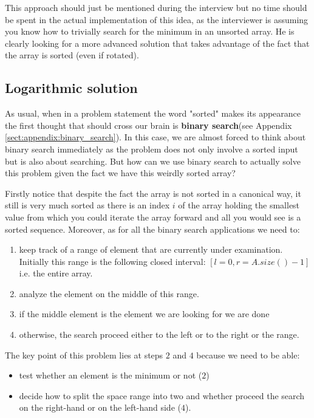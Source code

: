 


This approach should just be mentioned during the interview but no time should be spent in the actual implementation of this idea, as the interviewer is assuming you know how to trivially search for the minimum in an unsorted array. He is clearly looking for a more advanced solution that takes advantage of the fact that the array is sorted (even if rotated).

\subsection{Logarithmic solution}
\label{min_rotated_array:sec:log}
As usual, when in a problem statement the word "sorted" makes its appearance the first thought that should cross our brain is \textbf{binary search}(see Appendix \ref{sect:appendix:binary_search}). In this case, we are almost forced to think about binary search immediately as the problem does not only involve a sorted input but is also about searching. But how can we use binary search to actually solve this problem given the fact we have this weirdly sorted array? 

Firstly notice that despite the fact the array is not sorted in a canonical way, it still is very much sorted as there is an index $i$ of the array holding the smallest value from which you could iterate the array forward and all you would see is a sorted sequence.
Moreover, as for all the binary search applications we need to:
\begin{enumerate}
	\item keep track of a range of element that are currently under examination. Initially this range is the following closed interval: $[l=0, r=A.size()-1]$ i.e. the entire array.
	\item analyze the element on the middle of this range.
	\item if the middle element is the element we are looking for we are done
	\item otherwise, the search proceed either to the left or to the right or the range. 
\end{enumerate}

The key point of this problem lies at steps $2$ and $4$ because we need to be able:
\begin{itemize}
	\item test whether an element is the minimum or not ($2$)
	\item decide how to split the space range into two and whether proceed the search on the right-hand or on the left-hand side ($4$).
\end{itemize}

